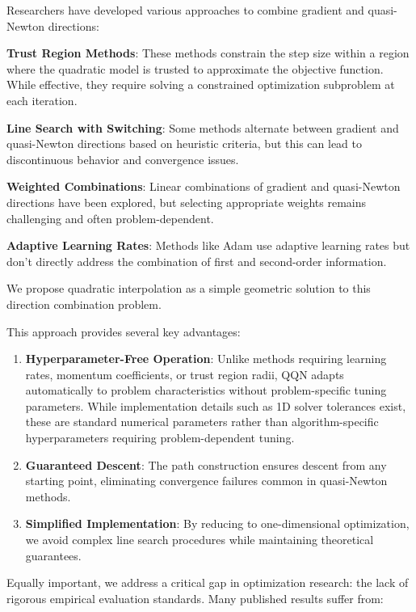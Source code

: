 Researchers have developed various approaches to combine gradient and quasi-Newton directions:

\textbf{Trust Region Methods}: These methods constrain the step size within a region where the quadratic model is trusted to approximate the objective function. While effective, they require solving a constrained optimization subproblem at each iteration.

\textbf{Line Search with Switching}: Some methods alternate between gradient and quasi-Newton directions based on heuristic criteria, but this can lead to discontinuous behavior and convergence issues.

\textbf{Weighted Combinations}: Linear combinations of gradient and quasi-Newton directions have been explored, but selecting appropriate weights remains challenging and often problem-dependent.

\textbf{Adaptive Learning Rates}: Methods like Adam use adaptive learning rates but don't directly address the combination of first and second-order information.

We propose quadratic interpolation as a simple geometric solution to this direction combination problem.

This approach provides several key advantages:

\begin{enumerate}
\def\labelenumi{\arabic{enumi}.}
\item
  \textbf{Hyperparameter-Free Operation}: Unlike methods requiring learning rates, momentum coefficients, or trust region radii, QQN adapts automatically to problem characteristics without problem-specific tuning parameters.
  While implementation details such as 1D solver tolerances exist, these are standard numerical parameters rather than algorithm-specific hyperparameters requiring problem-dependent tuning.
\item
  \textbf{Guaranteed Descent}: The path construction ensures descent from any starting point, eliminating convergence failures common in quasi-Newton methods.
\item
  \textbf{Simplified Implementation}: By reducing to one-dimensional optimization, we avoid complex line search procedures while maintaining theoretical guarantees.
\end{enumerate}

Equally important, we address a critical gap in optimization research: the lack of rigorous empirical evaluation standards. Many published results suffer from:

